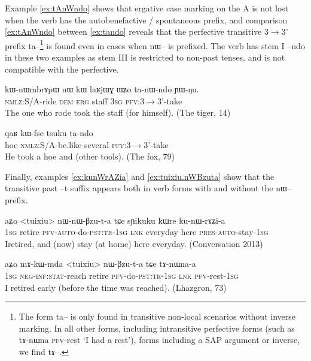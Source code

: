 \documentclass[oldfontcommands,oneside,a4paper,11pt]{article}
\newcommand{\ipa}[1]{{\phon \mbox{#1}}} %
\begin{document}
Example \ref{ex:tAnWndo} shows that ergative case marking on the A is not lost when the verb has the autobenefactive / spontaneous prefix, and comparison \ref{ex:tAnWndo} between  \ref{ex:tando} reveals that the perfective transitive 3$\rightarrow$3' prefix \ipa{ta--}\footnote{The  form \ipa{ta--} is only found in transitive non-local scenarios without inverse marking. In all other forms, including  intransitive perfective forms (such as \ipa{tɤ-nɯna} \textsc{pfv}-rest `I had a rest'), forms including a SAP argument or inverse, we find \ipa{tɤ--}.  } is found even in cases when \ipa{nɯ--} is prefixed. The verb has stem I \ipa{--ndo} in these two examples as stem III is restricted to non-past tenses, and is not compatible with the perfective.

 \begin{exe}
\ex \label{ex:tAnWndo}
\gll
\ipa{kɯ-nɯmbrɤpɯ} 	\ipa{nɯ} 	\ipa{kɯ} 	\ipa{laʁjɯɣ} 	\ipa{ɯʑo} 	\ipa{ta-nɯ-ndo} 	\ipa{ɲɯ-ŋu.} \\
\textsc{nmlz}:S/A-ride \textsc{dem} \textsc{erg} staff \textsc{3sg} \textsc{pfv}:3$\rightarrow$3'-take  \\ 
\glt The one who rode took the staff (for himself). (The tiger, 14) 
\end{exe}

 \begin{exe}
\ex \label{ex:tando}
\gll 
\ipa{qaʁ} 	\ipa{kɯ-fse} 	\ipa{tsuku} 	\ipa{ta-ndo}  \\
hoe  \textsc{nmlz}:S/A-be.like several \textsc{pfv}:3$\rightarrow$3'-take  \\ 
 \glt He took a hoe and (other tools). (The fox, 79)
\end{exe} 

Finally, examples \ref{ex:kunWrAZia} and \ref{ex:tuixiu.nWBzuta} show that the transitive past \ipa{--t} suffix appears both in verb forms with and without the \ipa{nɯ--} prefix.

 \begin{exe}
\ex \label{ex:kunWrAZia}
\gll 
\ipa{aʑo} 	<tuixiu> 	\ipa{nɯ-nɯ-βzu-t-a} 	\ipa{tɕe} 	\ipa{sɲikuku} 	\ipa{kɯre} 	\ipa{ku-nɯ-rɤʑi-a} \\
\textsc{1sg} retire \textsc{pfv-auto}-do-\textsc{pst:tr-1sg} \textsc{lnk} everyday here \textsc{pres-auto}-stay-\textsc{1sg} \\
\glt Iretired, and (now) stay (at home) here everyday. (Conversation 2013)
\end{exe} 

 \begin{exe}
\ex \label{ex:tuixiu.nWBzuta}
\gll 
\ipa{aʑo} 	\ipa{mɤ-kɯ-mda} 	<tuixiu> 	\ipa{nɯ-βzu-t-a} \ipa{tɕe} 	\ipa{tɤ-nɯna-a} \\
\textsc{1sg} \textsc{neg-inf:stat}-reach retire \textsc{pfv}-do-\textsc{pst:tr-1sg} \textsc{lnk} \textsc{pfv}-rest-\textsc{1sg} \\
\glt I retired early (before the time was reached). (Lhazgron, 73)
\end{exe} 
\end{document}
